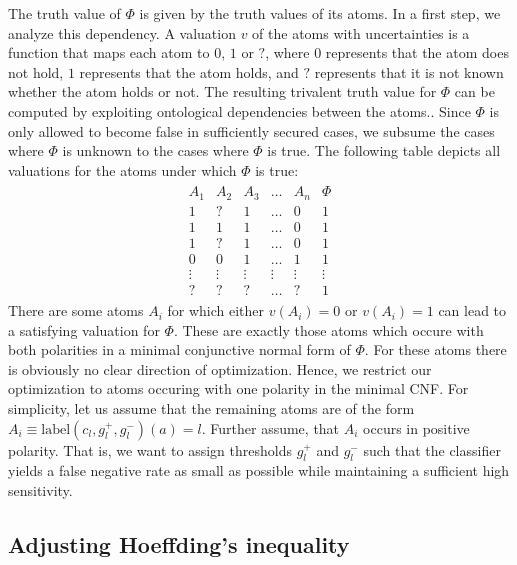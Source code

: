 The truth value of $\Phi$ is given by the truth values of its atoms. In a first step, we analyze this dependency. A valuation $v$ of the atoms with uncertainties is a function that maps each atom to $0$, $1$ or $?$, where $0$ represents that the atom does not hold, $1$ represents that the atom holds, and $?$ represents that it is not known whether the atom holds or not. The resulting trivalent truth value for $\Phi$ can be computed by exploiting ontological dependencies between the atoms.. Since $\Phi$ is only allowed
to become false in sufficiently secured cases, we subsume the cases where 
$\Phi$ is unknown to the cases where $\Phi$ is true. The following table depicts all
valuations for the atoms under which $\Phi$ is true:
\begin{gather*}
  \begin{array}{ccccc|c}
    A_1& A_2 & A_3 & \dots & A_n & \Phi\\
    \hline
    1  &  ?  &    1 & \dots& 0   & 1\\
    1  &  1  &    1 & \dots& 0   & 1\\    
    1  &  ?  &    1 & \dots& 0   & 1\\    
    0  &  0  &    1 & \dots& 1   & 1\\
    \vdots & \vdots & \vdots & \vdots &\vdots & \vdots\\
    ?  &  ?  &    ? & \dots& ?   & 1
  \end{array}
\end{gather*}
There are some atoms $A_i$ for which either $v(A_i)=0$ or $v(A_i)=1$ can lead to a satisfying valuation for $\Phi$. These are exactly those atoms which occure with both polarities in a minimal conjunctive normal form of $\Phi$. For these atoms there is obviously no clear direction of optimization. Hence, we restrict our optimization to atoms occuring with one polarity in the minimal CNF. For simplicity, let us assume that the remaining atoms are of the form $A_i\equiv\textrm{label}(c_l,g_l^+,g_l^-)(a)=l$. Further assume, that $A_i$ occurs in positive polarity. 
That is, we want to assign thresholds $g_l^+$ and $g_l^-$ such that the classifier yields a false negative rate as small as possible while maintaining a sufficient high sensitivity.

\subsection{Adjusting Hoeffding's inequality}











